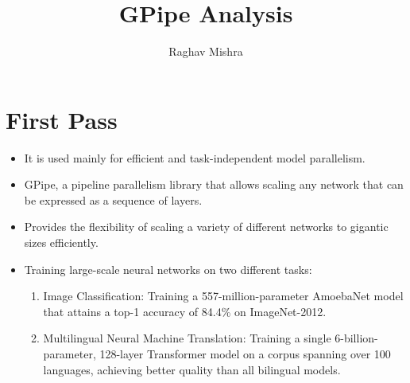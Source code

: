 \documentclass[12pt]{article}
\date{} %
\title{GPipe Analysis}
\author{Raghav Mishra}
\begin{document}
\maketitle

\section{First Pass}
\begin{itemize}
  \item It is used mainly for efficient and task-independent model parallelism.
  \item GPipe, a pipeline parallelism library that allows scaling any network that can be expressed as a sequence of layers.
  \item Provides the flexibility of scaling a variety of different networks to gigantic sizes efficiently.
  \item Training large-scale neural networks on two different tasks:
    \begin{enumerate}[label=(\roman*)]
      \item Image Classification: Training a 557-million-parameter AmoebaNet model that attains a top-1 accuracy of 84.4\% on ImageNet-2012.
      \item Multilingual Neural Machine Translation: Training a single 6-billion-parameter, 128-layer Transformer model on a corpus spanning over 100 languages, achieving better quality than all bilingual models.
    \end{enumerate}
\end{itemize}
\end{document}
